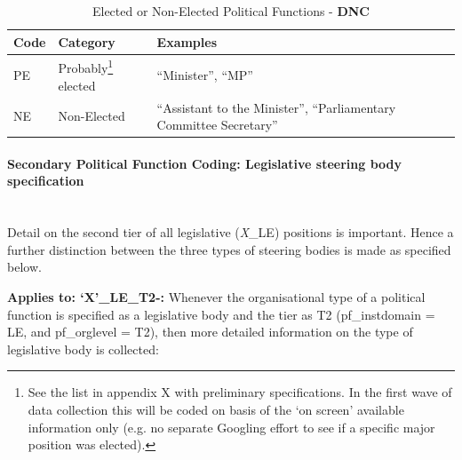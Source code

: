 \documentclass{article}
\begin{document}
\begin{table}[H]
    \begin{center}
         \begin{tabular}{|l|l|l|}
        Code & Category &  Examples \\
        \hline
        PE   & Probably\footnote{See the list in appendix X with preliminary specifications. In the first wave of data collection this will be coded on basis of the `on screen' available information only (e.g. no separate Googling effort to see if a specific major position was elected).}  elected & ``Minister'', ``MP'' \\
        NE   & Non-Elected & ``Assistant to the Minister'', ``Parliamentary Committee Secretary”\\
       
        \hline
        \end{tabular}\caption{Elected or Non-Elected Political Functions - \textbf{DNC}}
    \end{center}
\end{table}
    

\paragraph{Secondary Political Function Coding: Legislative steering body specification}\\

Detail on the second tier of all legislative (\textit{X}\_LE) positions is important. Hence a further distinction between the three types of steering bodies is made as specified below. \par

\textbf{Applies to: `X'\_LE\_T2-:} Whenever the organisational type of a political function is specified as a legislative body and the tier as T2 (pf\_instdomain = LE, and pf\_orglevel = T2), then more detailed information on the type of legislative body is collected:

\end{document}
